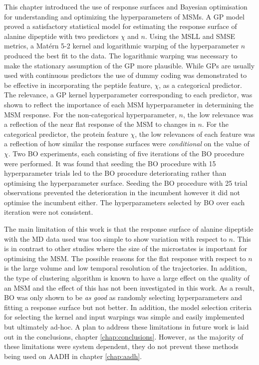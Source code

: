 This chapter introduced the use of response surfaces and Bayesian optimisation for understanding and optimizing the hyperparameters of MSMs. A GP model proved a satisfactory statistical model for estimating the response surface of alanine dipeptide with two predictors $\chi$ and $n$. Using the MSLL and SMSE metrics, a Mat\'{e}rn 5-2 kernel and logarithmic warping of the hyperparameter $n$ produced the best fit to the data.  The logarithmic warping was necessary to make the stationary assumption of the GP more plausible. While GPs are usually used with continuous predictors the use of dummy coding  was demonstrated to be effective in incorporating the peptide feature, $\chi$, as a categorical predictor. The relevance, a GP kernel hyperparameter corresponding to each predictor,  was shown to reflect the importance of each  MSM hyperparameter in determining the MSM response. For the non-categorical hyperparameter, $n$, the low relevance was a reflection of the near flat response of the MSM to changes in $n$. For the categorical predictor, the protein feature $\chi$, the low relevances of each feature was a reflection of how similar the response surfaces were \emph{conditional} on the value of $\chi$.  Two BO experiments, each consisting of five iterations of the BO procedure were performed. It was found that seeding the BO procedure with 15 hyperparameter trials led to the BO procedure deteriorating rather than optimising the hyperparameter surface. Seeding the BO procedure with 25 trial observations prevented the deterioration in the incumbent however it did not optimise the incumbent either. The hyperparameters selected by BO over each iteration were not consistent. 

The main limitation of this work is that the response surface of alanine dipeptide with the MD data used was too simple to show variation with respect to $n$. This is in contrast to other studies \cite{mcgibbonVariationalCrossvalidationSlow2015}\cite{wuVariationalApproachLearning2020c}\cite{prinzMarkovModelsMolecular2011} where the size of the microstates is important for optimising the MSM. The possible reasons for the flat response with respect to $n$ is the large volume and low temporal resolution of the trajectories. In addition, the type of clustering algorithm is known to have a large effect on the quality of an MSM \cite{husicWardClusteringImproves2017a} and the effect of this has not been investigated in this work. As a result, BO was only shown to be \emph{as good} as randomly selecting hyperparameters and fitting a response surface but not better. In addition, the model selection criteria for selecting the kernel and input warpings was simple and easily implemented but ultimately ad-hoc. A plan to address these limitations in future work is laid out in the conclusions, chapter \ref{chap:conclusions}. However, as the majority of these limitations were system dependent, they do not prevent these methods being used on AADH in chapter \ref{chap:aadh}. 

